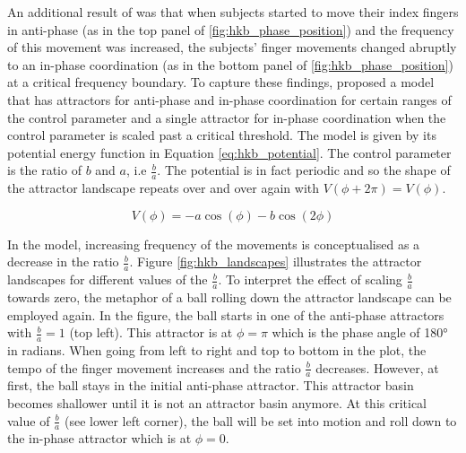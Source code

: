 An additional result of \citet{Kelso1981} was that when subjects started to move their index fingers in anti-phase (as in the top panel of \ref{fig:hkb_phase_position}) and the frequency of this movement was increased, the subjects' finger movements changed abruptly to an in-phase coordination (as in the bottom panel of \ref{fig:hkb_phase_position}) at a critical frequency boundary. To capture these findings, \citet{HakenKelsoBunz1985} proposed a model that has attractors for anti-phase and in-phase coordination for certain ranges of the control parameter and a single attractor for in-phase coordination when the control parameter is scaled past a critical threshold. The model is given by its potential energy function in Equation \ref{eq:hkb_potential}. The control parameter is the ratio of $b$ and $a$, i.e $\frac{b}{a}$. The potential is in fact periodic and so the shape of the attractor landscape repeats over and over again with $V(\phi + 2\pi) = V(\phi)$. 

\begin{equation}
V(\phi) = -a \cos(\phi) - b \cos( 2 \phi)
\label{eq:hkb_potential}
\end{equation}

In the model, increasing frequency of the movements is conceptualised as a decrease in the ratio $\frac{b}{a}$. Figure \ref{fig:hkb_landscapes} illustrates the attractor landscapes for different values of the $\frac{b}{a}$. To interpret the effect of scaling $\frac{b}{a}$ towards zero, the metaphor of a ball rolling down the attractor landscape can be employed again. In the figure, the ball starts in one of the anti-phase attractors with $\frac{b}{a} = 1$ (top left). This attractor is at $\phi = \pi$ which is the phase angle of 180° in radians. When going from left to right and top to bottom in the plot, the tempo of the finger movement increases and the ratio $\frac{b}{a}$ decreases. However, at first, the ball stays in the initial anti-phase attractor. This attractor basin becomes shallower until it is not an attractor basin anymore. At this critical value of $\frac{b}{a}$ (see lower left corner), the ball will be set into motion and roll down to the in-phase attractor which is at $\phi = 0$.

